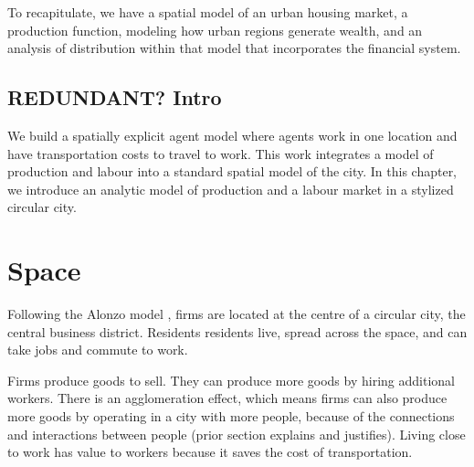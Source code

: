 To recapitulate, we have a spatial model of an urban housing market, a production function, modeling how urban regions generate wealth,  and an analysis of distribution within that model that incorporates the financial system.

\subsection{REDUNDANT? Intro}
We build a spatially explicit agent model where agents work in one location and have transportation costs to travel to work. 
This work integrates a model of production and labour into a standard spatial model of the city. In this chapter, we introduce an analytic model of production and a labour market in a stylized circular city. 

\section{Space}



Following the Alonzo model \cite{alonzoTheoryUrbanLand1960}, firms are located at the centre of a circular city, the central business district. Residents residents live, spread across the space, and can take jobs and commute to work.

Firms produce goods to sell. They can produce more goods by hiring additional workers. 
There is an agglomeration effect, which means firms can also produce more goods by operating in a city with more people, because of the connections and interactions between people (prior section explains and justifies). 
Living close to work has value to workers because it saves the cost of transportation. 

